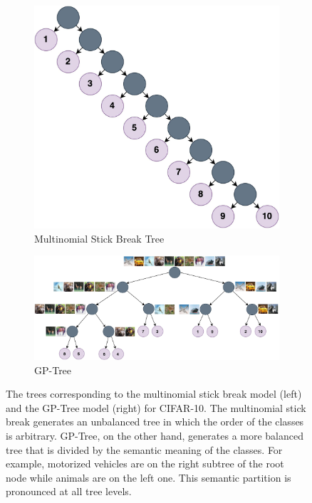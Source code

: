 \documentclass[preprint,11pt]{elsarticle}
\begin{document}
        \begin{figure}
            \centering
            \begin{subfigure}[b]{0.3\textwidth}
                \centering
                \includegraphics[width=\textwidth]{images/achituve21a.jpg}
                \caption{Multinomial Stick Break Tree}
                \label{fig:imagea1}
            \end{subfigure}
            \hfill
            \begin{subfigure}[b]{0.6\textwidth}
                \centering
                \includegraphics[width=\textwidth]{images/achituve21b.jpg}
                \caption{GP-Tree}
                \label{fig:imageb1}
            \end{subfigure}
            \caption{The trees corresponding to the multinomial stick break model (left) and the GP-Tree model (right) for CIFAR-10. The
            multinomial stick break generates an unbalanced tree in which the order of the classes is arbitrary. GP-Tree, on the other hand, generates a
            more balanced tree that is divided by the semantic meaning of the classes. For example, motorized vehicles are on the right subtree of the
            root node while animals are on the left one. This semantic partition is pronounced at all tree levels.}
            \label{fig:fig1}
        \end{figure}
\end{document}
